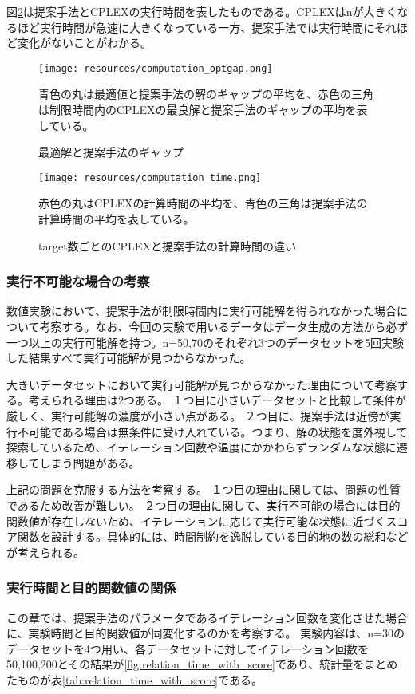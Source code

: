 \documentclass[11pt,a4paper,dvipdfmx,titlepage,uplatex]{jsarticle}
\theoremstyle{mystyle}
\newcommand{\0}{\mathbf{0}}
\begin{document}
	図\ref{fig:computation_time}は提案手法とCPLEXの実行時間を表したものである。CPLEXはnが大きくなるほど実行時間が急速に大きくなっている一方、提案手法では実行時間にそれほど変化がないことがわかる。
	
	\begin{figure}[htbp]
		\centering
		\texttt{[image: resources/computation\_optgap.png]}
		\caption{最適解と提案手法のギャップ}
		\begin{minipage}[c]{0.7\hsize}
			青色の丸は最適値と提案手法の解のギャップの平均を、赤色の三角は制限時間内のCPLEXの最良解と提案手法のギャップの平均を表している。
		\end{minipage}
		\label{fig:opt_gap}
	\end{figure}
	
	\begin{figure}[htbp]
		\centering
		\texttt{[image: resources/computation\_time.png]}
		\caption{target数ごとのCPLEXと提案手法の計算時間の違い}
		\begin{minipage}[c]{0.7\hsize}
			赤色の丸はCPLEXの計算時間の平均を、青色の三角は提案手法の計算時間の平均を表している。
		\end{minipage}
		\label{fig:computation_time}
	\end{figure}
	\subsubsection{実行不可能な場合の考察}
	数値実験において、提案手法が制限時間内に実行可能解を得られなかった場合について考察する。なお、今回の実験で用いるデータはデータ生成の方法から必ず一つ以上の実行可能解を持つ。n=50,70のそれぞれ3つのデータセットを5回実験した結果すべて実行可能解が見つからなかった。
	
	大きいデータセットにおいて実行可能解が見つからなかった理由について考察する。考えられる理由は2つある。
	１つ目に小さいデータセットと比較して条件が厳しく、実行可能解の濃度が小さい点がある。
	２つ目に、提案手法は近傍が実行不可能である場合は無条件に受け入れている。つまり、解の状態を度外視して探索しているため、イテレーション回数や温度にかかわらずランダムな状態に遷移してしまう問題がある。
	
	上記の問題を克服する方法を考察する。
	１つ目の理由に関しては、問題の性質であるため改善が難しい。
	２つ目の理由に関して、実行不可能の場合には目的関数値が存在しないため、イテレーションに応じて実行可能な状態に近づくスコア関数を設計する。具体的には、時間制約を逸脱している目的地の数の総和などが考えられる。
	\subsubsection{実行時間と目的関数値の関係}\label{sec:relation_with_time_and_score}
	この章では、提案手法のパラメータであるイテレーション回数を変化させた場合に、実験時間と目的関数値が同変化するのかを考察する。
	実験内容は、n=30のデータセットを4つ用い、各データセットに対してイテレーション回数を50,100,200とその結果が\ref{fig:relation_time_with_score}であり、統計量をまとめたものが表\ref{tab:relation_time_with_score}である。
	
\end{document}
